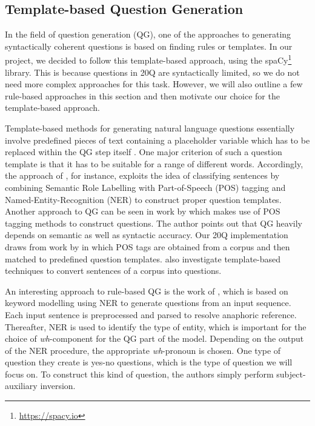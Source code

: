 \documentclass[11pt,a4paper]{article}
\begin{document}
\subsection{Template-based Question Generation}
\label{subsec:qglit}


In the field of question generation (QG), one of the approaches to generating syntactically coherent questions is based on finding rules or templates. 
In our project, we decided to follow this template-based approach, using the spaCy\footnote{\url{https://spacy.io}} library.
This is because questions in 20Q are syntactically limited, so we do not need more complex approaches for this task.
However, we will also outline a few rule-based approaches in this section and then motivate our choice for the template-based approach.

Template-based methods for generating natural language questions essentially involve predefined pieces of text containing a placeholder variable which has to be replaced within the QG step itself \citep{Mandasari2019}. 
One major criterion of such a question template is that it has to be suitable for a range of different words. 
Accordingly, the approach of \citet{Mandasari2019}, for instance, exploits the idea of classifying sentences by combining Semantic Role Labelling with Part-of-Speech (POS) tagging and Named-Entity-Recognition (NER) to construct proper question templates. 
Another approach to QG can be seen in work by \citet{Zerr2014} which makes use of POS tagging methods to construct questions. The author points out that QG heavily depends on semantic as well as syntactic accuracy. 
Our 20Q implementation draws from work by \citet{Zerr2014} in which POS tags are obtained from a corpus and then matched to predefined question templates. \citet{FabbriEa2020} also investigate template-based techniques to convert sentences of a corpus into questions. 

An interesting approach to rule-based QG is the work of \citet{MhatreEa2019}, which is based on keyword modelling using NER to generate questions from an input sequence. 
Each input sentence is preprocessed and parsed to resolve anaphoric reference. 
Thereafter, NER is used to identify the type of entity, which is important for the choice of \textit{wh}-component for the QG part of the model. 
Depending on the output of the NER procedure, the appropriate \textit{wh}-pronoun is chosen. 
One type of question they create is yes-no questions, which is the type of question we will focus on.
To construct this kind of question, the authors simply perform subject-auxiliary inversion. 
\end{document}
